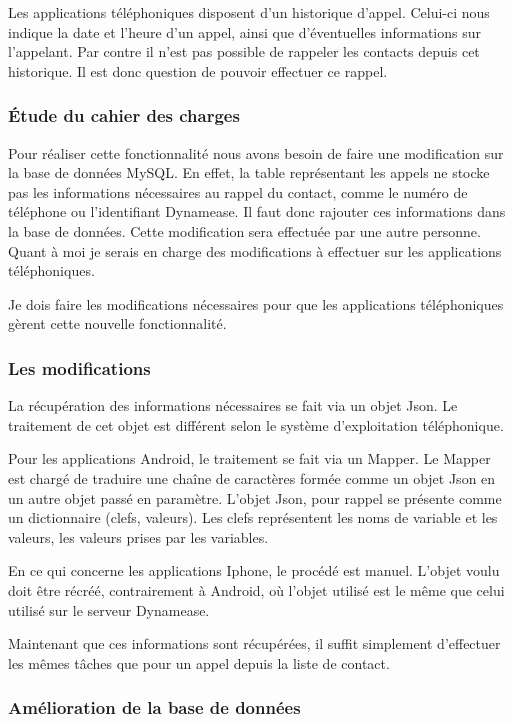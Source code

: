 Les applications téléphoniques disposent d'un historique d'appel. Celui-ci nous indique la date et l'heure d'un appel, ainsi que d'éventuelles informations sur l'appelant. Par contre il n'est pas possible de rappeler les contacts depuis cet historique. Il est donc question de pouvoir effectuer ce rappel.

\subsubsection{Étude du cahier des charges}

Pour réaliser cette fonctionnalité nous avons besoin de faire une modification sur la base de données MySQL. En effet, la table représentant les appels ne stocke pas les informations nécessaires au rappel du contact, comme le numéro de téléphone ou l'identifiant Dynamease. Il faut donc rajouter ces informations dans la base de données. Cette modification sera effectuée par une autre personne. Quant à moi je serais en charge des modifications à effectuer sur les applications téléphoniques.

Je dois faire les modifications nécessaires pour que les applications téléphoniques gèrent cette nouvelle fonctionnalité.

\subsubsection{Les modifications}

La récupération des informations nécessaires se fait via un objet Json. Le traitement de cet objet est différent selon le système d'exploitation téléphonique.

Pour les applications Android, le traitement se fait via un Mapper. Le Mapper est chargé de traduire une chaîne de caractères formée comme un objet Json en un autre objet passé en paramètre. L'objet Json, pour rappel se présente comme un dictionnaire (clefs, valeurs). Les clefs représentent les noms de variable et les valeurs, les valeurs prises par les variables.

En ce qui concerne les applications Iphone, le procédé est manuel. L'objet voulu doit être récréé, contrairement à Android, où l'objet utilisé est le même que celui utilisé sur le serveur Dynamease.

Maintenant que ces informations sont récupérées, il suffit simplement d'effectuer les mêmes tâches que pour un appel depuis la liste de contact.

\subsubsection{Amélioration de la base de données}

